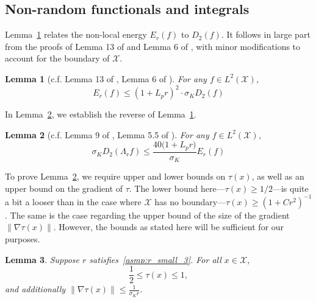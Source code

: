 \documentclass[twoside]{article}
\newcommand{\1}{\mathbf{1}}
\newcommand{\Xset}{\mathcal{X}}
\newcommand{\Leb}{L}
\newtheorem{lemma}{Lemma}
\theoremstyle{definition}
\theoremstyle{remark}
\begin{document}
\subsection{Non-random functionals and integrals}
\label{subsec:integrals}

Lemma~\ref{lem:first_order_graph_sobolev_seminorm_expected} relates the non-local energy $E_r(f)$ to $D_2(f)$. It follows in large part from the proofs of Lemma 13 of \cite{trillos2019} and Lemma 6 of \cite{burago2014}, with minor modifications to account for the boundary of $\Xset$.
\begin{lemma}[c.f. Lemma 13 of \cite{trillos2019}, Lemma 6 of \cite{burago2014}]
	\label{lem:first_order_graph_sobolev_seminorm_expected}
	For any $f \in \Leb^2(\Xset)$,
	\begin{equation*}
	E_r(f) \leq (1 + L_pr)^2 \cdot \sigma_K D_2(f)
	\end{equation*}
\end{lemma}

In Lemma~\ref{lem:first_order_graph_sobolev_seminorm_expected_lb}, we establish the reverse of Lemma~\ref{lem:first_order_graph_sobolev_seminorm_expected}. 
\begin{lemma}[c.f. Lemma 9 of \cite{trillos2019}, Lemma 5.5 of \cite{burago2014}]
	\label{lem:first_order_graph_sobolev_seminorm_expected_lb}
	For any $f \in \Leb^2(\Xset)$,
	\begin{equation*}
	\sigma_KD_2(\Lambda_rf) \leq \frac{40 \bigl(1 + L_p r\bigr)}{\sigma_K}E_r(f)
	\end{equation*}
\end{lemma}

To prove Lemma~\ref{lem:first_order_graph_sobolev_seminorm_expected_lb}, we require upper and lower bounds on $\tau(x)$, as well as an upper bound on the gradient of $\tau$. The lower bound here---$\tau(x) \geq 1/2$---is quite a bit a looser than in the case where $\Xset$ has no boundary---$\tau(x) \geq (1 + Cr^2)^{-1}$. The same is the case regarding the upper bound of the size of the gradient $\|\nabla \tau(x)\|$. However, the bounds as stated here will be sufficient for our purposes.
\begin{lemma}
	\label{lem:tau_bound}
	Suppose $r$ satisfies~\ref{asmp:r_small_3}. For all $x \in \Xset$,
	\begin{equation*}
	\frac{1}{2} \leq \tau(x) \leq 1,
	\end{equation*}
	and additionally $\|\nabla \tau(x)\| \leq \frac{1}{\sigma_K r}$.
\end{lemma}
\end{document}
